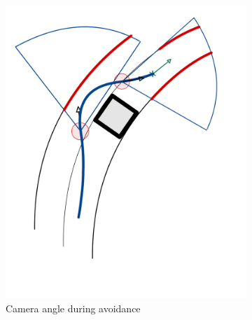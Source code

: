 \begin{figure}
\begin{subfigure}{.24\linewidth}
		\includegraphics[width=\textwidth]{Pictures/road detection blind}
		\caption{Camera angle during avoidance}
	\end{subfigure}
	\begin{subfigure}{.24\linewidth}

\end{subfigure}
\end{figure}
